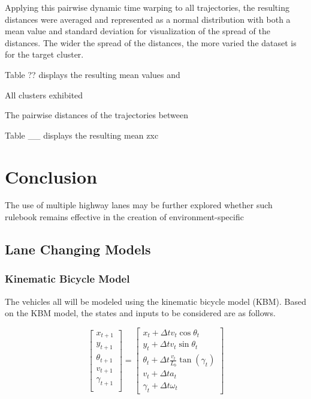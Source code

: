\documentclass[12pt, a4paper]{report}
\begin{document}
Applying this pairwise dynamic time warping to all trajectories, the resulting distances were averaged and represented as a normal distribution with both a mean value and standard deviation for visualization of the spread of the distances. The wider the spread of the distances, the more varied the dataset is for the target cluster.

Table ?? displays the resulting mean values and 

All clusters exhibited 

The pairwise distances of the trajectories between 

Table __ displays the resulting mean zxc

\section{Conclusion}

The use of multiple highway lanes may be further explored whether such rulebook remains effective in the creation of environment-specific 



\subsection{Lane Changing Models}
\subsubsection{Kinematic Bicycle Model}

The vehicles all will be modeled using the kinematic bicycle model (KBM). Based on the KBM model, the states and inputs to 
be considered are as follows.

\begin{equation}
    \begin{bmatrix}
        x_{t+1} \\
        y_{t+1} \\
        \theta_{t+1} \\
        v_{t+1} \\
        \gamma_{t+1} \\
    \end{bmatrix} =
    \begin{bmatrix}
        x_t + \Delta tv_t\cos{\theta_{t}} \\
        y_t + \Delta tv_t\sin{\theta_{t}} \\
        \theta_t + \Delta t\frac{v_t}{L_b}\tan(\gamma_t) \\
        v_t + \Delta ta_t\ \\
        \gamma_t + \Delta t \omega_t
    \end{bmatrix}
\end{equation}
\end{document}
